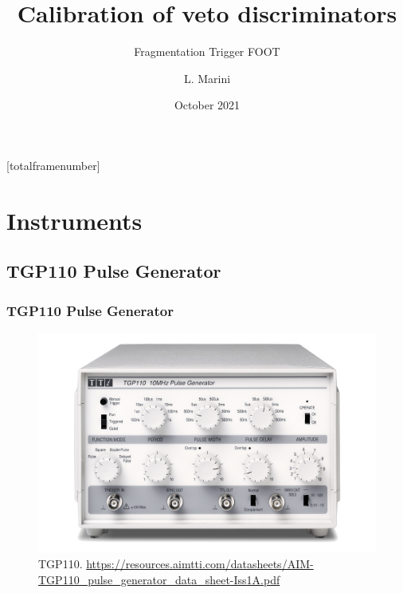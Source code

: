\documentclass[9pt]{beamer}
\title[Calibration of veto discriminators]{Calibration of veto discriminators}
\subtitle[]{Fragmentation Trigger FOOT}
\author[L. Marini, INFN Pisa ]{L. Marini}
\institute{INFN Pisa}
\date[October 2021]{October 2021}
\begin{document}
[totalframenumber] 

\frame{\titlepage}



\begin{frame} 
  	\tableofcontents
\end{frame}







\section{Instruments}
\subsection{TGP110 Pulse Generator}
\begin{frame} [fragile]
\small
	\frametitle{TGP110 Pulse Generator}
    		\begin{figure}
		 \centering
			\includegraphics[scale=0.20]{figures/instruments/AIM_TGP110_1k_0.jpg}
			\caption{TGP110. \url{https://resources.aimtti.com/datasheets/AIM-TGP110_pulse_generator_data_sheet-Iss1A.pdf}}
		\end{figure}
\end{frame}
\end{document}
